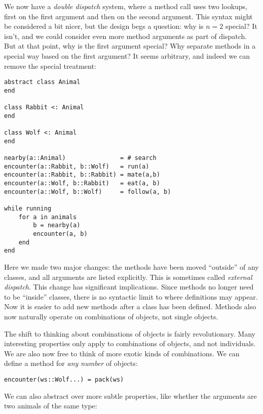 We now have a \emph{double dispatch} system, where a method call
uses two lookups, first on the first argument and then on the
second argument.
This syntax might be considered a bit nicer, but the design
begs a question: why is $n=2$ special?
It isn't, and we could consider even more method arguments as part of
dispatch.
But at that point, why is the first argument special?
Why separate methods in a special way based on the first argument?
It seems arbitrary, and indeed we can remove the special treatment:

\vspace{-3ex}
\begin{singlespace}
\begin{verbatim}
abstract class Animal
end

class Rabbit <: Animal
end

class Wolf <: Animal
end

nearby(a::Animal)               = # search
encounter(a::Rabbit, b::Wolf)   = run(a)
encounter(a::Rabbit, b::Rabbit) = mate(a,b)
encounter(a::Wolf, b::Rabbit)   = eat(a, b)
encounter(a::Wolf, b::Wolf)     = follow(a, b)

while running
    for a in animals
        b = nearby(a)
        encounter(a, b)
    end
end
\end{verbatim}
\end{singlespace}

Here we made two major changes: the methods have been moved ``outside''
of any classes, and all arguments are listed explicitly.
This is sometimes called \emph{external dispatch}.
This change has significant implications.
Since methods no longer need to be ``inside'' classes, there is no syntactic
limit to where definitions may appear.
Now it is easier to add new methods after a class has been defined.
Methods also now naturally operate on combinations of objects, not single objects.

The shift to thinking about combinations of objects is fairly revolutionary.
Many interesting properties only apply to combinations of objects, and not
individuals.
We are also now free to think of more exotic kinds of combinations.
We can define a method for \emph{any number} of objects:

\begin{verbatim}
encounter(ws::Wolf...) = pack(ws)
\end{verbatim}

\noindent
We can also abstract over more subtle properties, like whether the
arguments are two animals of the same type:


